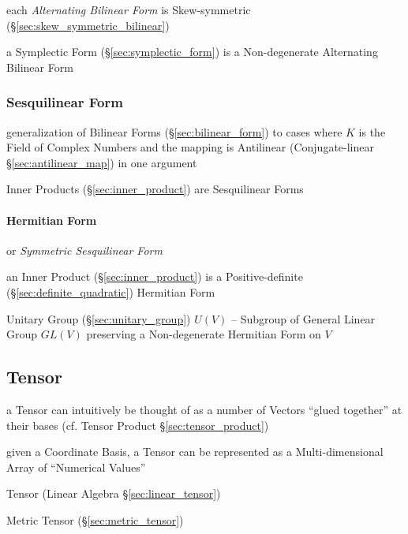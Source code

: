 {{each \emph{Alternating Bilinear Form} is Skew-symmetric
(\S\ref{sec:skew_symmetric_bilinear})

a Symplectic Form (\S\ref{sec:symplectic_form}) is a Non-degenerate Alternating
Bilinear Form



\subsubsection{Sesquilinear Form}\label{sec:sesquilinear_form}

generalization of Bilinear Forms (\S\ref{sec:bilinear_form}) to cases where $K$
is the Field of Complex Numbers and the mapping is Antilinear (Conjugate-linear
\S\ref{sec:antilinear_map}) in one argument

Inner Products (\S\ref{sec:inner_product}) are Sesquilinear Forms



\paragraph{Hermitian Form}\label{sec:hermitian_form}\hfill

or \emph{Symmetric Sesquilinear Form}

an Inner Product (\S\ref{sec:inner_product}) is a Positive-definite
(\S\ref{sec:definite_quadratic}) Hermitian Form

Unitary Group (\S\ref{sec:unitary_group}) $U(V)$ -- Subgroup of General Linear
Group $GL(V)$ preserving a Non-degenerate Hermitian Form on $V$



\subsection{Tensor}\label{sec:tensor}


a Tensor can intuitively be thought of as a number of Vectors ``glued together''
at their bases (cf. Tensor Product \S\ref{sec:tensor_product})

given a Coordinate Basis, a Tensor can be represented as a Multi-dimensional
Array of ``Numerical Values'' %

\fist Tensor (Linear Algebra \S\ref{sec:linear_tensor})

\fist Metric Tensor (\S\ref{sec:metric_tensor})

}}
